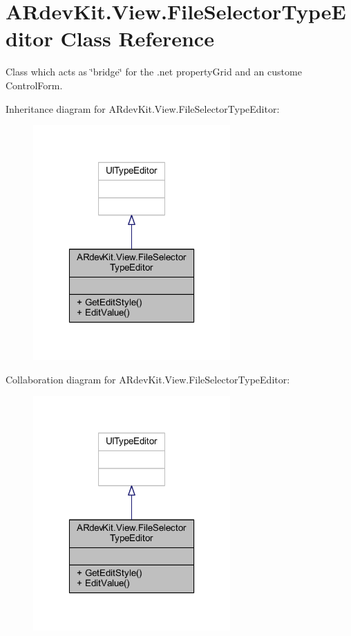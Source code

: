 \hypertarget{class_a_rdev_kit_1_1_view_1_1_file_selector_type_editor}{\section{A\-Rdev\-Kit.\-View.\-File\-Selector\-Type\-Editor Class Reference}
\label{class_a_rdev_kit_1_1_view_1_1_file_selector_type_editor}
}


Class which acts as \char`\"{}bridge\char`\"{} for the .net property\-Grid and an custome Control\-Form.  




Inheritance diagram for A\-Rdev\-Kit.\-View.\-File\-Selector\-Type\-Editor\-:
\nopagebreak
\begin{figure}[H]
\begin{center}
\leavevmode
\includegraphics[width=214pt]{class_a_rdev_kit_1_1_view_1_1_file_selector_type_editor__inherit__graph}
\end{center}
\end{figure}


Collaboration diagram for A\-Rdev\-Kit.\-View.\-File\-Selector\-Type\-Editor\-:
\nopagebreak
\begin{figure}[H]
\begin{center}
\leavevmode
\includegraphics[width=214pt]{class_a_rdev_kit_1_1_view_1_1_file_selector_type_editor__coll__graph}
\end{center}
\end{figure}

